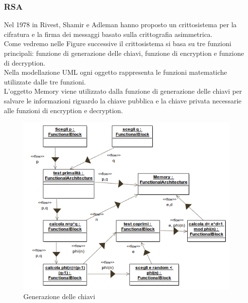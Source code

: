 \subsubsection*{RSA}
Nel 1978 in \cite{RSA78} Rivest, Shamir e Adleman hanno proposto un crittosistema per la cifratura e la firma dei messaggi basato sulla crittografia asimmetrica.\\
Come vedremo nelle Figure successive il crittosistema si basa su tre funzioni principali: funzione di generazione delle chiavi, funzione di encryption e funzione di decryption.\\
Nella modellazione UML ogni oggetto rappresenta le funzioni matematiche utilizzate dalle tre funzioni.\\ 
L'oggetto Memory viene utilizzato dalla funzione di generazione delle chiavi per salvare le informazioni riguardo la chiave pubblica e la chiave privata necessarie alle funzioni di encryption e decryption.\\  
\begin{figure}[h!] 
    \centering 
    \includegraphics[scale=0.6]{img/RSA/Key_Generation_Object_diagram.png} 
    \caption{Generazione delle chiavi} 
\end{figure}
